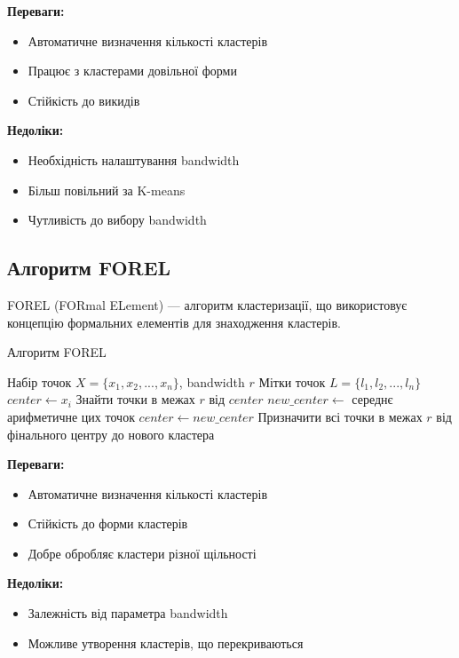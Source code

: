 \documentclass[12pt,a4paper]{article}
\begin{document}
\textbf{Переваги:}
\begin{itemize}
    \item Автоматичне визначення кількості кластерів
    \item Працює з кластерами довільної форми
    \item Стійкість до викидів
\end{itemize}

\textbf{Недоліки:}
\begin{itemize}
    \item Необхідність налаштування bandwidth
    \item Більш повільний за K-means
    \item Чутливість до вибору bandwidth
\end{itemize}

\subsection{Алгоритм FOREL}

FOREL (FORmal ELement) — алгоритм кластеризації, що використовує концепцію формальних елементів для знаходження кластерів.

\begin{algorithm}[H]
\caption{Алгоритм FOREL}
\begin{algorithmic}[1]
\REQUIRE Набір точок $X = \{x_1, x_2, ..., x_n\}$, bandwidth $r$
\ENSURE Мітки точок $L = \{l_1, l_2, ..., l_n\}$
    \STATE $center \leftarrow x_i$
    \REPEAT
        \STATE Знайти точки в межах $r$ від $center$
        \STATE $new\_center \leftarrow$ середнє арифметичне цих точок
        \STATE $center \leftarrow new\_center$
    \STATE Призначити всі точки в межах $r$ від фінального центру до нового кластера
\ENDFOR
\end{algorithmic}
\end{algorithm}

\textbf{Переваги:}
\begin{itemize}
    \item Автоматичне визначення кількості кластерів
    \item Стійкість до форми кластерів
    \item Добре обробляє кластери різної щільності
\end{itemize}

\textbf{Недоліки:}
\begin{itemize}
    \item Залежність від параметра bandwidth
    \item Можливе утворення кластерів, що перекриваються
\end{itemize}
\end{document}
